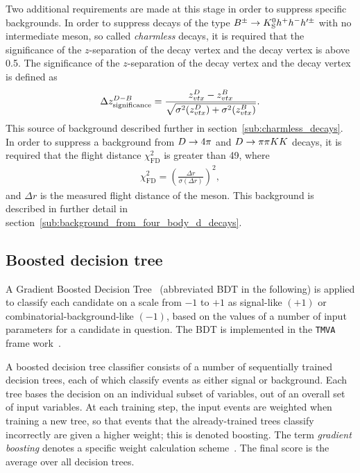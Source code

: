 Two additional requirements are made at this stage in order to suppress specific backgrounds.
In order to suppress decays of the type ${{B}^\pm} \rightarrow {\ensuremath{{K}^0_{\mathrm{S}}}} h^+h^- h'^\pm$ with no intermediate \D meson, so called \emph{charmless} decays, it is required that the significance of the $z$-separation of the \Dz decay vertex and the \Bpm decay vertex is above 0.5. The significance of the $z$-separation of the \Dz decay vertex and the \Bpm decay vertex is defined as
\begin{align}\label{eg:Dz_sig_def}
    \Delta z^{D-B}_{\text{significance}}=\frac{z_{vtx}^{D}-z_{vtx}^{B}}{\sqrt{\sigma^2(z_{vtx}^{D})+\sigma^2(z_{vtx}^{B})}}.
\end{align} This source of background described further in section~\ref{sub:charmless_decays}. In order to suppress a background from ${D}\rightarrow4\pi$ and ${D}\rightarrow\pi\pi{\ensuremath{K}}{\ensuremath{K}}$ decays,  it is required that the \KS flight distance $\chi^2_\text{FD}$ is greater than 49, where
\begin{align}\label{eq:fdchisq_def}
    \chi^2_\text{FD} = \left(\frac{\Delta r}{\sigma(\Delta r)}\right)^2,
\end{align} and $\Delta r$ is the measured flight distance of the \KS meson. This background is described in further detail in section~\ref{sub:background_from_four_body_d_decays}. 




\subsection{Boosted decision tree} %
\label{sub:boosted_decision_tree}

A Gradient Boosted Decision Tree~\cite{Breiman} (abbreviated BDT in the following) is applied to classify each candidate on a scale from $-1$ to $+1$ as signal-like $(+1)$ or combinatorial-background-like $(-1)$, based on the values of a number of input parameters for a candidate in question. The BDT is implemented in the \texttt{TMVA} frame work~\cite{Hocker:2007ht,*TMVA4}.

A boosted decision tree classifier consists of a number of sequentially trained decision trees, each of which classify events as either signal or background. Each tree bases the decision on an individual subset of variables, out of an overall set of input variables. At each training step, the input events are weighted when training a new tree, so that events that the already-trained trees classify incorrectly are given a higher weight; this is denoted boosting. The term \emph{gradient boosting} denotes a specific weight calculation scheme~\cite{Breiman}. The final score is the average over all decision trees.

